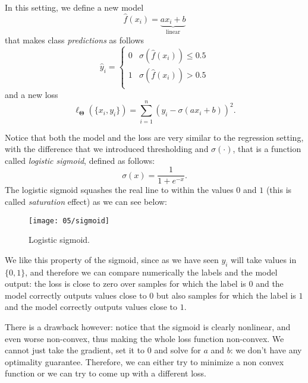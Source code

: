 In this setting, we define a new model
\begin{equation}
    \hat{f}(x_i) = \underbrace{ax_i + b}_\text{linear}
\end{equation}
that makes class \emph{predictions} as follows
\begin{equation}
    \hat{y}_i = \begin{cases}
        0 & \sigma(\hat{f}(x_i)) \leq 0.5 \\
        1 & \sigma(\hat{f}(x_i)) > 0.5 \\
    \end{cases}
\end{equation}
and a new loss
\begin{equation}
	\ell_\mathbf{\Theta}(\{x_i, y_i\}) = \sum_{i=1}^{n}\left( y_i - \sigma(ax_i + b) \right)^2.
\end{equation}

Notice that both the model and the loss are very similar to the regression setting, with the difference that we introduced thresholding and $\sigma(\cdot)$, that is a function called \emph{logistic sigmoid}, defined as follows:
\begin{equation}
	\sigma(x) = \frac{1}{1+e^{-x}}.
\end{equation}
The logistic sigmoid squashes the real line to within the values $0$ and $1$ (this is called \emph{saturation} effect) as we can see below:
\begin{figure}[H]
	\centering
	\texttt{[image: 05/sigmoid]}
	\caption{Logistic sigmoid.}\label{fig:sigmoid}	
\end{figure}
We like this property of the sigmoid, since as we have seen $y_i$ will take values in $\{0, 1\}$, and therefore we can compare numerically the labels and the model output: the loss is close to zero over samples for which the label is $0$ and the model correctly outputs values close to $0$ but also samples for which the label is $1$ and the model correctly outputs values close to $1$.

There is a drawback however: notice that the sigmoid is clearly nonlinear, and even worse non-convex, thus making the whole loss function non-convex. We cannot just take the gradient, set it to $0$ and solve for $a$ and $b$: we don't have any optimality guarantee. Therefore, we can either try to minimize a non convex function or we can try to come up with a different loss. 

